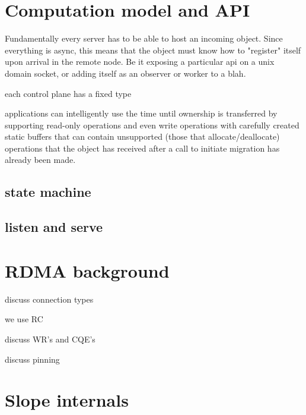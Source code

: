 
\section{Computation model and API}

Fundamentally every server has to be able to host an incoming object.
Since everything is async, this means that the object must know how to
"register" itself upon arrival in the remote node. Be it exposing a particular
api on a unix domain socket, or adding itself as an observer or worker to a blah.

each control plane has a fixed type

applications can intelligently use the time until ownership is transferred by
supporting read-only operations and even write operations with carefully
created static buffers that can contain unsupported (those that allocate/deallocate)
operations that the object has received after a call to initiate migration has
already been made.


\subsection{state machine}

\subsection{listen and serve}


\section{RDMA background}

discuss connection types

we use RC

discuss WR's and CQE's

discuss pinning

\section{Slope internals}


